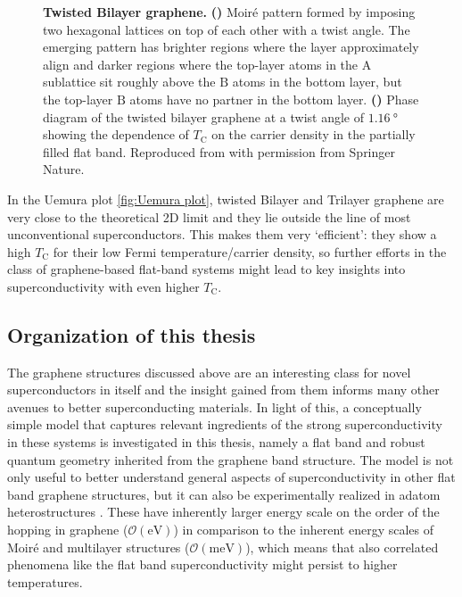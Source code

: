 \documentclass[../main.tex]{subfiles}
\begin{document}
\begin{figure}[tb]
\begin{subfigure}[b]{0.5\textwidth}
	\end{subfigure}%
	\caption[Twisted Bilayer graphene.]{
		\textbf{Twisted Bilayer graphene.} \textbf{()} Moiré pattern formed by imposing two hexagonal lattices on top of each other with a twist angle. The emerging pattern has brighter regions where the layer approximately align and darker regions where the top-layer atoms in the \(\mathrm{A}\) sublattice sit roughly above the \(\mathrm{B}\) atoms in the bottom layer, but the top-layer \(\mathrm{B}\) atoms have no partner in the bottom layer.
		\textbf{()} Phase diagram of the twisted bilayer graphene at a twist angle of \(\qty{1.16}{\degree}\) showing the dependence of \(T_{\mathrm{C}}\) on the carrier density in the partially filled flat band.
		Reproduced from \cite{caoUnconventionalSuperconductivityMagicangle2018} with permission from Springer Nature.
	}
\end{figure}
In the Uemura plot \cref{fig:Uemura plot}, twisted Bilayer and Trilayer graphene are very close to the theoretical 2D limit \cite{hazraBoundsSuperconductingTransition2019} and they lie outside the line of most unconventional superconductors.
This makes them very `efficient': they show a high \(T_{\mathrm{C}}\) for their low Fermi temperature/carrier density, so further efforts in the class of graphene-based flat-band systems might lead to key insights into superconductivity with even higher \(T_{\mathrm{C}}\).

\subsection*{Organization of this thesis}

The graphene structures discussed above are an interesting class for novel superconductors in itself and the insight gained from them informs many other avenues to better superconducting materials. 
In light of this, a conceptually simple model that captures relevant ingredients of the strong superconductivity in these systems is investigated in this thesis, namely a flat band and robust quantum geometry inherited from the graphene band structure.
The model is not only useful to better understand general aspects of superconductivity in other flat band graphene structures, but it can also be experimentally realized in adatom heterostructures \cite{ghosalElectronicCorrelationsEpitaxial2024, wittQuantumGeometryLocal2025}.
These have inherently larger energy scale on the order of the hopping in graphene (\(\mathcal{O} (\unit{\electronvolt})\)) in comparison to the inherent energy scales of Moiré and multilayer structures (\(\mathcal{O} (\unit{\milli\electronvolt})\)), which means that also correlated phenomena like the flat band superconductivity might persist to higher temperatures.
\end{document}
